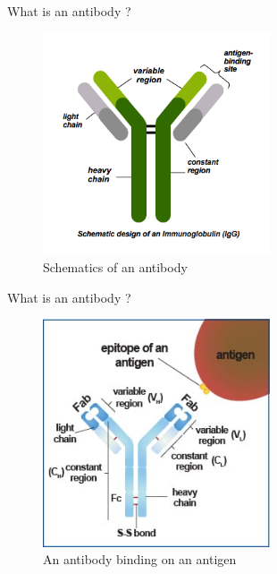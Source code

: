 \begin{frame}{What is an antibody ?}
    \begin{figure}
        \centering
        \includegraphics[width=0.6\textwidth]{../Images/schematics_antibody.png}
        \caption{Schematics of an antibody}
        \label{fig:schematics_antibody}
    \end{figure}
\end{frame}

\begin{frame}{What is an antibody ?}


    \begin{figure}
        \centering
        \includegraphics[width=0.6\textwidth]{../Images/antibody_on_antigen.jpg}
        \caption{An antibody binding on an antigen}
        \label{fig:antibody_on_antigen}
    \end{figure}
\end{frame}


